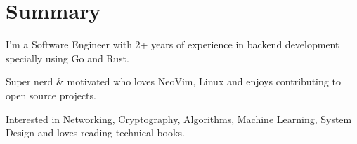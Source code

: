 \section{Summary}\closesection{}

I'm a Software Engineer with 2+ years of experience in backend development specially using Go and Rust.

Super nerd \& motivated who loves NeoVim, Linux and enjoys contributing to open source projects.

Interested in Networking, Cryptography, Algorithms, Machine Learning, System Design and loves reading technical books.
